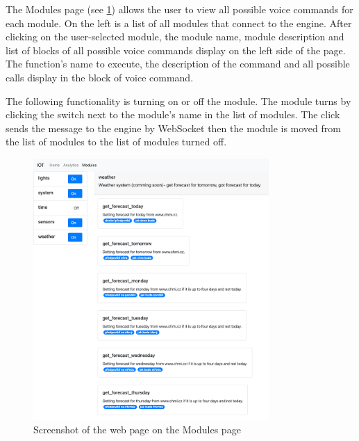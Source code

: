 The Modules page (see \cref{fig:web_modules}) allows the user to view all possible voice commands for each module. On the left is a list of all modules that connect to the engine. After clicking on the user-selected module, the module name, module description and list of blocks of all possible voice commands display on the left side of the page. The function's name to execute, the description of the command and all possible calls display in the block of voice command.

The following functionality is turning on or off the module. The module turns by clicking the switch next to the module's name in the list of modules. The click sends the message to the engine by WebSocket then the module is moved from the list of modules to the list of modules turned off.

\begin{figure}[H]
    \centering
    \includegraphics[width=0.8\textwidth]{img/web_modules.png}
    \caption{Screenshot of the web page on the Modules page}
    \label{fig:web_modules}
\end{figure}

